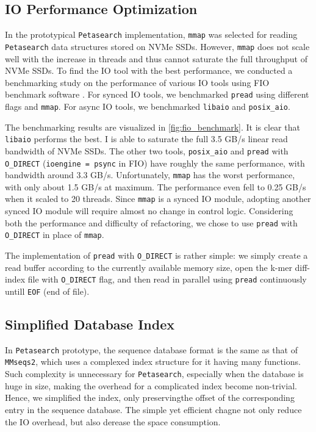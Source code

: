 \subsection{IO Performance Optimization} \label{section:io-performance}

In the prototypical \texttt{Petasearch} implementation, \texttt{mmap} was selected for reading \texttt{Petasearch} data structures stored on NVMe SSDs.
However, \texttt{mmap} does not scale well with the increase in threads \cite{papagiannis_optimizing_2020} and thus cannot saturate the full throughput of NVMe SSDs.
To find the IO tool with the best performance, we conducted a benchmarking study on the performance of various IO tools using FIO benchmark software \cite{axboe_flexible_2022}.
For synced IO tools, we benchmarked \texttt{pread} using different flags and \texttt{mmap}.
For async IO tools, we benchmarked \texttt{libaio} and \texttt{posix\_aio}.

The benchmarking results are visualized in \autoref{fig:fio_benchmark}.
It is clear that \texttt{libaio} performs the best.
I is able to saturate the full 3.5 GB/s linear read bandwidth of NVMe SSDs.
The other two tools, \texttt{posix\_aio} and \texttt{pread} with \texttt{O\_DIRECT} (\texttt{ioengine = psync} in FIO) have roughly the same performance, with bandwidth around 3.3 GB/s.
Unfortunately, \texttt{mmap} has the worst performance, with only about 1.5 GB/s at maximum.
The performance even fell to 0.25 GB/s when it scaled to 20 threads.
Since \texttt{mmap} is a synced IO module, adopting another synced IO module will require almost no change in control logic.
Considering both the performance and difficulty of refactoring, we chose to use \texttt{pread} with \texttt{O\_DIRECT} in place of \texttt{mmap}.

The implementation of \texttt{pread} with \texttt{O\_DIRECT} is rather simple: we simply create a read buffer according to the currently available memory size, open the k-mer diff-index file with \texttt{O\_DIRECT} flag, and then read in parallel using \texttt{pread} continuously untill \texttt{EOF} (end of file).

\subsection{Simplified Database Index} \label{section:simplified-database-index}

In \texttt{Petasearch} prototype, the sequence database format is the same as that of \texttt{MMseqs2}, which uses a complexed index structure for it having many functions.
Such complexity is unnecessary for \texttt{Petasearch}, especially when the database is huge in size, making the overhead for a complicated index become non-trivial.
Hence, we simplified the index, only preservingthe offset of the corresponding entry in the sequence database.
The simple yet efficient chagne not only reduce the IO overhead, but also derease the space consumption.

